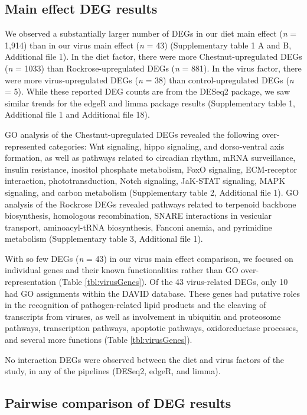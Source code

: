 \documentclass{bmcart}
\begin{document}
\begin{linenumbers}
\begin{doublespacing}
\subsection*{Main effect DEG results}

We observed a substantially larger number of DEGs in our diet main effect (\textit{n} = 1,914) than in our virus main effect (\textit{n} = 43) (Supplementary table 1 A and B, Additional file 1). In the diet factor, there were more Chestnut-upregulated DEGs (\textit{n} = 1033) than Rockrose-upregulated DEGs (\textit{n} = 881). In the virus factor, there were more virus-upregulated DEGs (\textit{n} = 38) than control-upregulated DEGs (\textit{n} = 5). While these reported DEG counts are from the DESeq2 package, we saw similar trends for the edgeR and limma package results (Supplementary table 1, Additional file 1 and Additional file 18).

GO analysis of the Chestnut-upregulated DEGs revealed the following over-represented categories: Wnt signaling, hippo signaling, and dorso-ventral axis formation, as well as pathways related to circadian rhythm, mRNA surveillance, insulin resistance, inositol phosphate metabolism, FoxO signaling, ECM-receptor interaction, phototransduction, Notch signaling, JaK-STAT signaling, MAPK signaling, and carbon metabolism (Supplementary table 2, Additional file 1). GO analysis of the Rockrose DEGs revealed pathways related to terpenoid backbone biosynthesis, homologous recombination, SNARE interactions in vesicular transport, aminoacyl-tRNA biosynthesis, Fanconi anemia, and pyrimidine metabolism (Supplementary table 3, Additional file 1).

With so few DEGs (\textit{n} = 43) in our virus main effect comparison, we focused on individual genes and their known functionalities rather than GO over-representation (Table \ref{tbl:virusGenes}). Of the 43 virus-related DEGs, only 10 had GO assignments within the DAVID database. These genes had putative roles in the recognition of pathogen-related lipid products and the cleaving of transcripts from viruses, as well as involvement in ubiquitin and proteosome pathways, transcription pathways, apoptotic pathways, oxidoreductase processes, and several more functions (Table \ref{tbl:virusGenes}).

No interaction DEGs were observed between the diet and virus factors of the study, in any of the pipelines (DESeq2, edgeR, and limma).

\subsection*{Pairwise comparison of DEG results}


\end{doublespacing}
\end{linenumbers}
\end{document}
